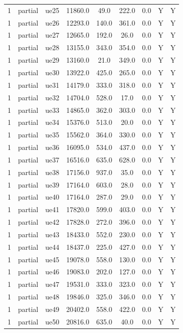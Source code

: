 \begin{table}[ht]
\begin{tabular}{|c|c|c|c|c|c|c|c|c|}
1 & partial & ue25 & 11860.0 & 49.0 & 222.0 & 0.0 & Y & Y \\
1 & partial & ue26 & 12293.0 & 140.0 & 361.0 & 0.0 & Y & Y \\
1 & partial & ue27 & 12665.0 & 192.0 & 26.0 & 0.0 & Y & Y \\
1 & partial & ue28 & 13155.0 & 343.0 & 354.0 & 0.0 & Y & Y \\
1 & partial & ue29 & 13160.0 & 21.0 & 349.0 & 0.0 & Y & Y \\
1 & partial & ue30 & 13922.0 & 425.0 & 265.0 & 0.0 & Y & Y \\
1 & partial & ue31 & 14179.0 & 333.0 & 318.0 & 0.0 & Y & Y \\
1 & partial & ue32 & 14704.0 & 528.0 & 17.0 & 0.0 & Y & Y \\
1 & partial & ue33 & 14865.0 & 362.0 & 303.0 & 0.0 & Y & Y \\
1 & partial & ue34 & 15376.0 & 513.0 & 20.0 & 0.0 & Y & Y \\
1 & partial & ue35 & 15562.0 & 364.0 & 330.0 & 0.0 & Y & Y \\
1 & partial & ue36 & 16095.0 & 534.0 & 437.0 & 0.0 & Y & Y \\
1 & partial & ue37 & 16516.0 & 635.0 & 628.0 & 0.0 & Y & Y \\
1 & partial & ue38 & 17156.0 & 937.0 & 35.0 & 0.0 & Y & Y \\
1 & partial & ue39 & 17164.0 & 603.0 & 28.0 & 0.0 & Y & Y \\
1 & partial & ue40 & 17164.0 & 287.0 & 29.0 & 0.0 & Y & Y \\
1 & partial & ue41 & 17820.0 & 599.0 & 403.0 & 0.0 & Y & Y \\
1 & partial & ue42 & 17828.0 & 272.0 & 396.0 & 0.0 & Y & Y \\
1 & partial & ue43 & 18433.0 & 552.0 & 230.0 & 0.0 & Y & Y \\
1 & partial & ue44 & 18437.0 & 225.0 & 427.0 & 0.0 & Y & Y \\
1 & partial & ue45 & 19078.0 & 558.0 & 130.0 & 0.0 & Y & Y \\
1 & partial & ue46 & 19083.0 & 202.0 & 127.0 & 0.0 & Y & Y \\
1 & partial & ue47 & 19531.0 & 333.0 & 323.0 & 0.0 & Y & Y \\
1 & partial & ue48 & 19846.0 & 325.0 & 346.0 & 0.0 & Y & Y \\
1 & partial & ue49 & 20402.0 & 558.0 & 422.0 & 0.0 & Y & Y \\
1 & partial & ue50 & 20816.0 & 635.0 & 40.0 & 0.0 & Y & Y \\

\end{tabular}
\end{table}
